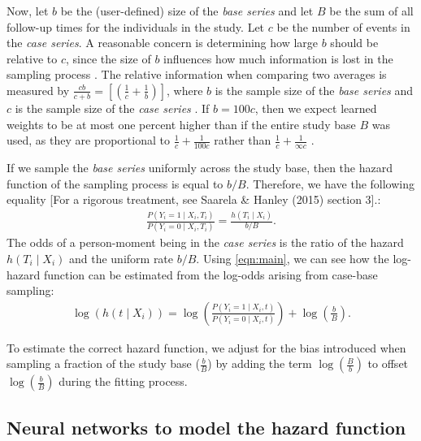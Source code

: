 \documentclass[preprint,12pt,authoryear]{elsarticle}
\begin{document}
Now, let \(b\) be the (user-defined) size of the \emph{base series} and let \(B\) be the sum of all follow-up
times for the individuals in the study. Let $c$ be the number of events in the \emph{case series}. A
reasonable concern is determining how large $b$ should be relative to $c$, since the size of \(b\)
influences how much information is lost in the sampling process \citep{hanley2009}. The relative information when comparing two averages
is measured by $\frac{cb}{c+b}=\left[\left( \frac{1}{c}+\frac{1}{b}\right)\right]$, where $b$ is the sample size of the \emph{base series} and $c$
is the sample size of the \emph{case series} \citep{hanley2009} \citep{mantel1}. If $b=100c$, then we expect learned weights to be at most one
percent higher than if the entire study base $B$ was used, as they are proportional to
$\frac{1}{c}+\frac{1}{100c}$ rather than $\frac{1}{c}+\frac{1}{\infty c}$ \citep{hanley2009} \citep{mantel1}.

If we sample the \emph{base series} uniformly across the study base, then the hazard function
of the sampling process is equal to \(b/B\). Therefore, we have the following equality \citep{saarela2015}
[For a rigorous treatment, see Saarela \& Hanley (2015) section 3].:
\begin{align}\label{eqn:main}
\frac{P\left(Y_i=1 \mid X_i, T_i\right)}{P\left(Y_i = 0 \mid X_i, T_i\right)} = \frac{h\left(T_i \mid X_i\right)}{b/B}.
\end{align} The odds of a person-moment being in the \emph{case
series} is the ratio of the hazard \(h(T_i \mid X_i)\) and the uniform
rate \(b/B\). Using \eqref{eqn:main}, we can see how the log-hazard
function can be estimated from the log-odds arising from case-base
sampling: \begin{align}\label{eqn:offset}
\log \left( h\left(t \mid X_i\right)\right) = \log \left(\frac{P\left(Y_i = 1 \mid X_i, t\right)}{P\left(Y_i = 0 \mid X_i, t\right)}\right) + \log\left(\frac{b}{B}\right).
\end{align}

To estimate the correct hazard function, we adjust for the bias introduced when sampling a fraction of the
study base (\(\frac{b}{B}\)) by adding the term \(\log\left(\frac{B}{b} \right)\) to offset \(\log\left(\frac{b}{B} \right)\)
during the fitting process.

\hypertarget{neural-networks-to-model-the-hazard-function}{%
\subsection{Neural networks to model the hazard
function}\label{neural-networks-to-model-the-hazard-function}}
\end{document}
